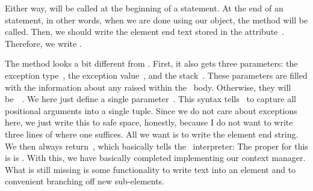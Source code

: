 %
%
%
Either way,  will be called at the beginning of a  statement.
At the end of an  statement, in other words, when we are done using our object, the  method will be called.
Then, we should write the element end text stored in the attribute~.
Therefore, we write .

The  method looks a bit different from .
First, it also gets three parameters: the exception type~, the exception value~, and the stack~.
These parameters are filled with the information about any  raised within the ~body.
Otherwise, they will be~~\cite{PSF:P3D:TPLR:WSCM}.
We here just define a single parameter~.
This syntax tells \python\ to capture all positional arguments into a single tuple.
Since we do not care about exceptions here, we just write this to safe space, honestly, because I do not want to write three lines of  where one suffices.
All we want is to write the element end string.
We then always return~, which basically tells the \python~interpreter:
\emph{}
The proper  for this is  is .%
%
%
%
With this, we have basically completed implementing our context manager.
What is still missing is some functionality to write text into an element and to convenient branching off new sub-elements.

